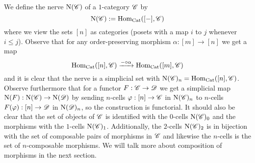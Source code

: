 \documentclass[../../thesis.tex]{subfiles}
\begin{document}
\begin{example}
\end{example}
\begin{example}\label{NerveDef}
    We define the nerve $\mathrm{N}(\mathscr{C})$ of a $1$-category $\mathscr{C}$ by
    \[
        \mathrm{N}(\mathscr{C}) : = \mathrm{Hom}_{\mathrm{Cat}}([{-}], \mathscr{C})
    \]
    where we view the sets $[n]$ as categories (posets with a map $i$ to $j$ whenever $i\leq j$).
    Observe that for any order-preserving morphism $\alpha : [m] \to [n]$ we get a map
    \[
        \mathrm{Hom}_{\mathrm{Cat}}([n], \mathscr{C}) \xrightarrow{{-} \circ \alpha} \mathrm{Hom}_{\mathrm{Cat}}([m], \mathscr{C})
    \]
    and it is clear that the nerve is a simplicial set with $\mathrm{N}(\mathscr{C})_n = \mathrm{Hom}_{\mathrm{Cat}}([n], \mathscr{C})$.
    \newline
    Observe furthermore that for a functor $F: \mathscr{C} \to \mathscr{D}$ we get a simplicial map $\mathrm{N}(F):\mathrm{N}(\mathscr{C}) \to \mathrm{N}(\mathscr{D})$ by sending $n$-cells $\varphi : [n] \to \mathscr{C}$ in $\mathrm{N}(\mathscr{C})_n$ to $n$-cells $F(\varphi) : [n] \to \mathscr{D}$ in $\mathrm{N}(\mathscr{D})_n$, so the construction is functorial.
    It should also be clear that the set of objects of $\mathscr{C}$ is identified with the $0$-cells $\mathrm{N}(\mathscr{C})_0$ and the morphisms with the $1$-cells $\mathrm{N}(\mathscr{C})_1$.
    Additionally, the $2$-cells $\mathrm{N}(\mathscr{C})_2$ is in bijection with the set of composable pairs of morphisms in $\mathscr{C}$ and likewise the $n$-cells is the set of $n$-composable morphisms.
    We will talk more about composition of morphisms in the next section.
\end{example}
\end{document}
